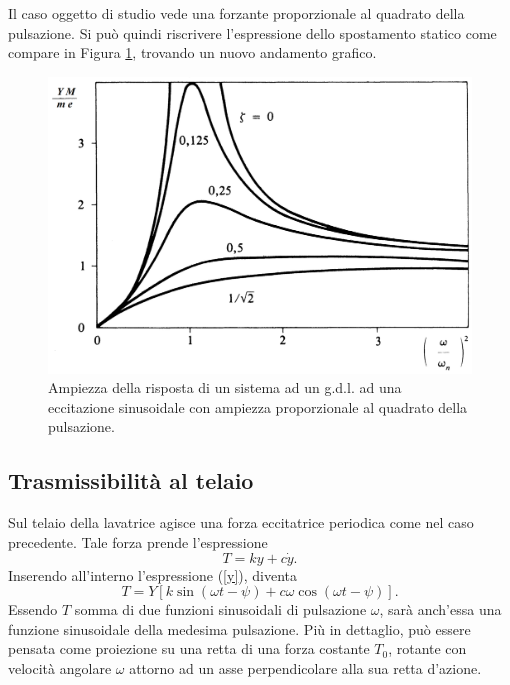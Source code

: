 Il caso oggetto di studio vede una forzante proporzionale al quadrato della pulsazione. Si può quindi riscrivere l'espressione dello spostamento statico come compare in Figura \ref{AmpiezzaEfaseQuadratoDellaPulsazione}, trovando un nuovo andamento grafico.
\begin{figure}[h]
    \centering
    \includegraphics[scale=0.14]{AmpiezzaEfaseQuadratoDellaPulsazione.png}
    \caption{Ampiezza della risposta di un sistema ad un g.d.l. ad una eccitazione sinusoidale con ampiezza proporzionale al quadrato della pulsazione.}
    \label{AmpiezzaEfaseQuadratoDellaPulsazione}
\end{figure}
\subsection{Trasmissibilità al telaio}
Sul telaio della lavatrice agisce una forza eccitatrice periodica come nel caso precedente. Tale forza prende l'espressione \begin{equation}
    T=k y+c \dot y.
\end{equation}
Inserendo all'interno l'espressione (\ref{y}), diventa
\begin{equation}
    T=Y\left[k\sin (\omega t -\psi)+c \omega\cos(\omega t-\psi)\right].
\end{equation}
Essendo $T$ somma di due funzioni sinusoidali di pulsazione $\omega$, sarà anch'essa una funzione sinusoidale della medesima pulsazione. Più in dettaglio, può essere pensata come proiezione su una retta di una forza costante $T_0$, rotante con velocità angolare $\omega$ attorno ad un asse perpendicolare alla sua retta d'azione. 

